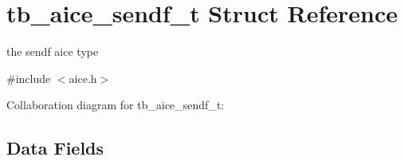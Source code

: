 \hypertarget{structtb__aice__sendf__t}{\section{tb\-\_\-aice\-\_\-sendf\-\_\-t Struct Reference}
\label{structtb__aice__sendf__t}
}


the sendf aice type  




{\ttfamily \#include $<$aice.\-h$>$}



Collaboration diagram for tb\-\_\-aice\-\_\-sendf\-\_\-t\-:
\subsection*{Data Fields}
